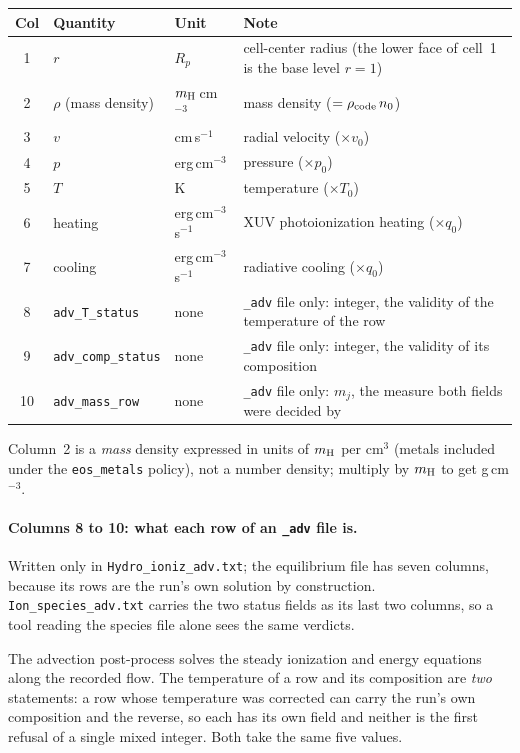 \documentclass[english,a4paper]{my_memo}
\newcommand{\rp}{\ensuremath{R_p}}   %
\begin{document}
\begin{center}\small
\begin{tabular}{@{}clll@{}}
\toprule
Col & Quantity & Unit & Note \\
\midrule
1 & $r$ & \rp & cell-center radius (the lower face of cell~1 is the base level $r=1$) \\
2 & $\rho$ (mass density) & $m_{\rm H}$\,cm$^{-3}$ & mass density ($=\rho_{\rm code}\,n_0$) \\
3 & $v$ & cm\,s$^{-1}$ & radial velocity ($\times v_0$) \\
4 & $p$ & erg\,cm$^{-3}$ & pressure ($\times p_0$) \\
5 & $T$ & K & temperature ($\times T_0$) \\
6 & heating & erg\,cm$^{-3}$\,s$^{-1}$ & XUV photoionization heating ($\times q_0$) \\
7 & cooling & erg\,cm$^{-3}$\,s$^{-1}$ & radiative cooling ($\times q_0$) \\
8 & \texttt{adv\_T\_status} & none & \texttt{\_adv} file only: integer, the validity of
   the temperature of the row \\
9 & \texttt{adv\_comp\_status} & none & \texttt{\_adv} file only: integer, the validity of
   its composition \\
10 & \texttt{adv\_mass\_row} & none & \texttt{\_adv} file only: $m_j$, the measure both
   fields were decided by \\
\bottomrule
\end{tabular}
\end{center}

\noindent Column~2 is a \emph{mass} density expressed in units of $m_{\rm H}$ per
cm$^3$ (metals included under the \texttt{eos\_metals} policy), not a number
density; multiply by $m_{\rm H}$ to get g\,cm$^{-3}$.

\paragraph{Columns 8 to 10: what each row of an \texttt{\_adv} file is.} Written only in
\texttt{Hydro\_ioniz\_adv.txt}; the equilibrium file has seven columns, because its rows
are the run's own solution by construction. \texttt{Ion\_species\_adv.txt} carries the two
status fields as its last two columns, so a tool reading the species file alone sees the
same verdicts.

The advection post-process solves the steady ionization and energy equations along the
recorded flow. The temperature of a row and its composition are \emph{two} statements: a
row whose temperature was corrected can carry the run's own composition and the reverse, so
each has its own field and neither is the first refusal of a single mixed integer. Both take
the same five values.
\end{document}
